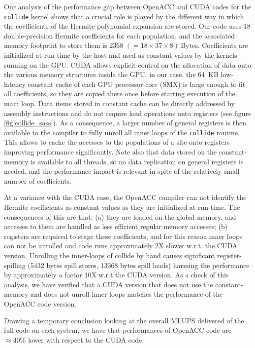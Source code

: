 \documentclass[times]{cpeauth}
\begin{document}
Our analysis of the performance gap between OpenACC and CUDA codes for the 
{\tt collide} kernel shows that a crucial role is played by the different way 
in which the coefficients of the Hermite polynomial expansion are stored.
%
Our code uses 18 double-precision Hermite coefficients for each population, and 
the associated memory footprint to store them is 2368 $( = 18 \times 37 \times 8 )~\mbox{Bytes}$.
%
Coefficients are initialized at run-time by the host and used as constant values 
by the kernels running on the GPU.
%
CUDA allows explicit control on the allocation of data onto the various memory structures 
inside the GPU; in our case, the 64~KB low-latency constant cache of each GPU processor-core (SMX) is large enough to fit all coefficients, 
so they are copied there once before starting execution of the main loop. 
%
Data items stored in constant cache can be directly addressed by assembly instructions and 
do not require load operations onto registers (see figure \ref{fig:collide_sass}). As a consequence, a larger number of general 
registers is then available to the compiler to fully unroll all inner loops of the {\tt collide} 
routine.
%
This allows to cache the accesses to the populations of a site onto registers improving 
performance significantly.
%
Note also that data stored on the constant-memory is available to all threads, so no data 
replication on general registers is needed, and the performance impact is relevant in spite 
of the relatively small number of coefficients.

At a variance with the CUDA case, the OpenACC compiler can not identify the Hermite 
coefficients as constant values as they are initialized at run-time.
%
The consequences of this are that: (a) they are loaded on the global memory, and accesses 
to them are handled as less efficient regular memory accesses; 
(b) registers are required to stage these coefficients, and for this reason inner loops 
can not be unrolled and code runs approximately 2X slower w.r.t. the CUDA version. 
% 
Unrolling the inner-loops of collide by hand causes significant register-spilling 
(5432 bytes spill stores, 13368 bytes spill loads) harming the performance by approximately 
a factor 10X w.r.t the CUDA version. 
%
As a check of this analysis, we have verified that a CUDA version that does not use the 
constant-memory and does not unroll inner loops matches the performance of the OpenACC 
code version.

Drawing a temporary conclusion looking at the overall MLUPS delivered of the full 
code on each system, we have that performances of OpenACC code are $\approx 40\%$ 
lower with respect to the CUDA code.
\end{document}
